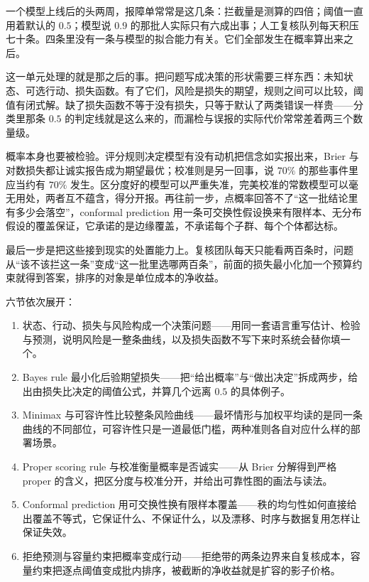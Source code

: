 一个模型上线后的头两周，报障单常常是这几条：拦截量是测算的四倍；阈值一直用着默认的 \(0.5\)；模型说 \(0.9\) 的那批人实际只有六成出事；人工复核队列每天积压七十条。四条里没有一条与模型的拟合能力有关。它们全部发生在概率算出来之后。

这一单元处理的就是那之后的事。把问题写成决策的形状需要三样东西：未知状态、可选行动、损失函数。有了它们，风险是损失的期望，规则之间可以比较，阈值有闭式解。缺了损失函数不等于没有损失，只等于默认了两类错误一样贵——分类里那条 \(0.5\) 的判定线就是这么来的，而漏检与误报的实际代价常常差着两三个数量级。

概率本身也要被检验。评分规则决定模型有没有动机把信念如实报出来，Brier 与对数损失都让诚实报告成为期望最优；校准则是另一回事，说 \(70\%\) 的那些事件里应当约有 \(70\%\) 发生。区分度好的模型可以严重失准，完美校准的常数模型可以毫无用处，两者互不蕴含，得分开报。再往前一步，点概率回答不了``这一批结论里有多少会落空''，conformal prediction 用一条可交换性假设换来有限样本、无分布假设的覆盖保证，它承诺的是边缘覆盖，不承诺每个子群、每个个体都达标。

最后一步是把这些接到现实的处置能力上。复核团队每天只能看两百条时，问题从``该不该拦这一条''变成``这一批里选哪两百条''，前面的损失最小化加一个预算约束就得到答案，排序的对象是单位成本的净收益。

六节依次展开：

\begin{enumerate}
\tightlist
\item
  状态、行动、损失与风险构成一个决策问题——用同一套语言重写估计、检验与预测，说明风险是一整条曲线，以及损失函数不写下来时系统会替你填一个。
\item
  Bayes rule 最小化后验期望损失——把``给出概率''与``做出决定''拆成两步，给出由损失比决定的阈值公式，并算几个远离 \(0.5\) 的具体例子。
\item
  Minimax 与可容许性比较整条风险曲线——最坏情形与加权平均读的是同一条曲线的不同部位，可容许性只是一道最低门槛，两种准则各自对应什么样的部署场景。
\item
  Proper scoring rule 与校准衡量概率是否诚实——从 Brier 分解得到严格 proper 的含义，把区分度与校准分开，并给出可靠性图的画法与读法。
\item
  Conformal prediction 用可交换性换有限样本覆盖——秩的均匀性如何直接给出覆盖不等式，它保证什么、不保证什么，以及漂移、时序与数据复用怎样让保证失效。
\item
  拒绝预测与容量约束把概率变成行动——拒绝带的两条边界来自复核成本，容量约束把逐点阈值变成批内排序，被截断的净收益就是扩容的影子价格。
\end{enumerate}

